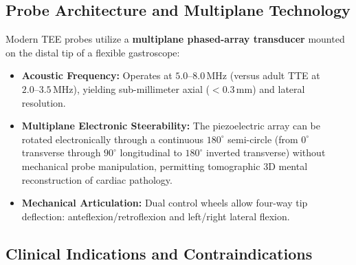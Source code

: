 \documentclass[11pt,a4paper]{article}
\begin{document}
\subsection{Probe Architecture and Multiplane Technology}

Modern TEE probes utilize a \textbf{multiplane phased-array transducer} mounted on the distal tip of a flexible gastroscope:
\begin{itemize}[leftmargin=*]
    \item \textbf{Acoustic Frequency:} Operates at $5.0\text{--}8.0\,\text{MHz}$ (versus adult TTE at $2.0\text{--}3.5\,\text{MHz}$), yielding sub-millimeter axial ($< 0.3\,\text{mm}$) and lateral resolution.
    \item \textbf{Multiplane Electronic Steerability:} The piezoelectric array can be rotated electronically through a continuous $180^\circ$ semi-circle (from $0^\circ$ transverse through $90^\circ$ longitudinal to $180^\circ$ inverted transverse) without mechanical probe manipulation, permitting tomographic 3D mental reconstruction of cardiac pathology.
    \item \textbf{Mechanical Articulation:} Dual control wheels allow four-way tip deflection: anteflexion/retroflexion and left/right lateral flexion.
\end{itemize}

\subsection{Clinical Indications and Contraindications}
\end{document}
